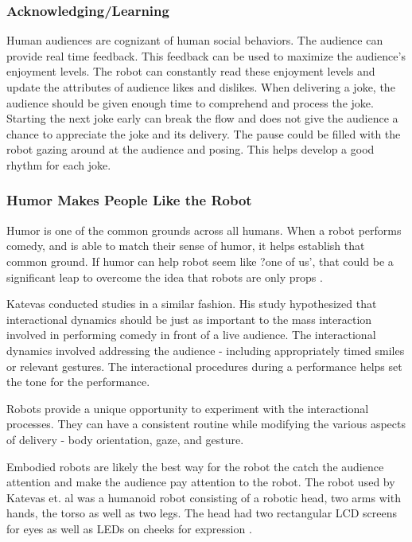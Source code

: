 \subsubsection{Acknowledging/Learning}
Human audiences are cognizant of human social behaviors. The audience can provide real time feedback. This feedback can be used to maximize the audience's enjoyment levels. The robot can constantly read these enjoyment levels and update the attributes of audience likes and dislikes. When delivering a joke, the audience should be given enough time to comprehend and process the joke. Starting the next joke early can break the flow and does not give the audience a chance to appreciate the joke and its delivery. The pause could be filled with the robot gazing around at the audience and posing. This helps develop a good rhythm for each joke.

\subsubsection{Humor Makes People Like the Robot }
Humor is one of the common grounds across all humans. When a robot performs comedy, and is able to match their sense of humor, it helps establish that common ground. If humor can help robot seem like ?one of us', that could be a significant leap to overcome the idea that robots are only props \cite{KnightEightLessons:2011}.


Katevas conducted studies in a similar fashion. His study hypothesized that interactional dynamics should be just as important to the mass interaction involved in performing comedy in front of a live audience. The interactional dynamics involved addressing the audience - including appropriately timed smiles or relevant gestures. The interactional procedures during a performance helps set the tone for the performance.

Robots provide a unique opportunity to experiment with the interactional processes. They can have a consistent routine while modifying the various aspects of delivery - body orientation, gaze, and gesture.

Embodied robots are likely the best way for the robot the catch the audience attention and make the audience pay attention to the robot. The robot used by Katevas et. al was a humanoid robot consisting of a robotic head, two arms with hands, the torso as well as two legs. The head had two rectangular LCD screens for eyes as well as LEDs on cheeks for expression \cite{RobotComedyLab:2015}.

